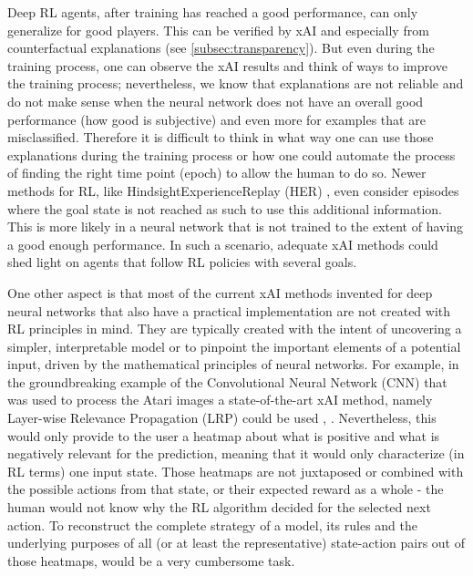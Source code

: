 \documentclass[twoside,11pt]{article}
\begin{document}
Deep RL agents, after training has reached a good performance, can only generalize for good players. This can be verified by xAI and especially from counterfactual explanations (see \ref{subsec:transparency}). But even during the training process, one can observe the xAI results and think of ways to improve the training process; nevertheless, we know that explanations are not reliable and do not make sense when the neural network does not have an overall good performance (how good is subjective) and even more for examples that are misclassified. Therefore it is difficult to think in what way one can use those explanations during the training process or how one could automate the process of finding the right time point (epoch) to allow the human to do so. Newer methods for RL, like HindsightExperienceReplay (HER) \cite{Andrychowicz:2017:HERHindsightExperienceReplay}, even consider episodes where the goal state is not reached as such to use this additional information. This is more likely in a neural network that is not trained to the extent of having a good enough performance. In such a scenario, adequate xAI methods could shed light on agents that follow RL policies with several goals. 

One other aspect is that most of the current xAI methods invented for deep neural networks that also have a practical implementation are not created with RL principles in mind. They are typically created with the intent of uncovering a simpler, interpretable model or to pinpoint the important elements of a potential input, driven by the mathematical principles of neural networks. For example, in the groundbreaking example of the Convolutional Neural Network (CNN) that was used to process the Atari images \cite{Mnih:2013:PlayingAtariDeepRL} a state-of-the-art xAI method, namely Layer-wise Relevance Propagation (LRP) could be used \cite{Bach:2015:LayerWiseRelevancePropagation}, \cite{Alber:2019:Innvestigate}. Nevertheless, this would only provide to the user a heatmap about what is positive and what is negatively relevant for the prediction, meaning that it would only characterize (in RL terms) one input state. Those heatmaps are not juxtaposed or combined with the possible actions from that state, or their expected reward as a whole - the human would not know why the RL algorithm decided for the selected next action. To reconstruct the complete strategy of a model, its rules and the underlying purposes of all (or at least the representative) state-action pairs out of those heatmaps, would be a very cumbersome task. 
\end{document}
